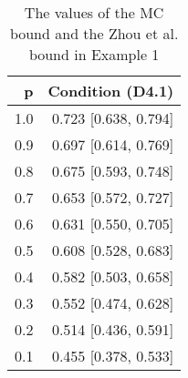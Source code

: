 \begin{table}

\caption{\label{tab:tab1}The values of the MC bound and the Zhou et al. bound in Example 1}
\centering
\begin{tabular}[t]{rr}
\toprule
p & Condition (D4.1)\\
\midrule
1.0 & 0.723 [0.638, 0.794]\\
0.9 & 0.697 [0.614, 0.769]\\
0.8 & 0.675 [0.593, 0.748]\\
0.7 & 0.653 [0.572, 0.727]\\
0.6 & 0.631 [0.550, 0.705]\\
0.5 & 0.608 [0.528, 0.683]\\
0.4 & 0.582 [0.503, 0.658]\\
0.3 & 0.552 [0.474, 0.628]\\
0.2 & 0.514 [0.436, 0.591]\\
0.1 & 0.455 [0.378, 0.533]\\
\bottomrule
\end{tabular}
\end{table}
